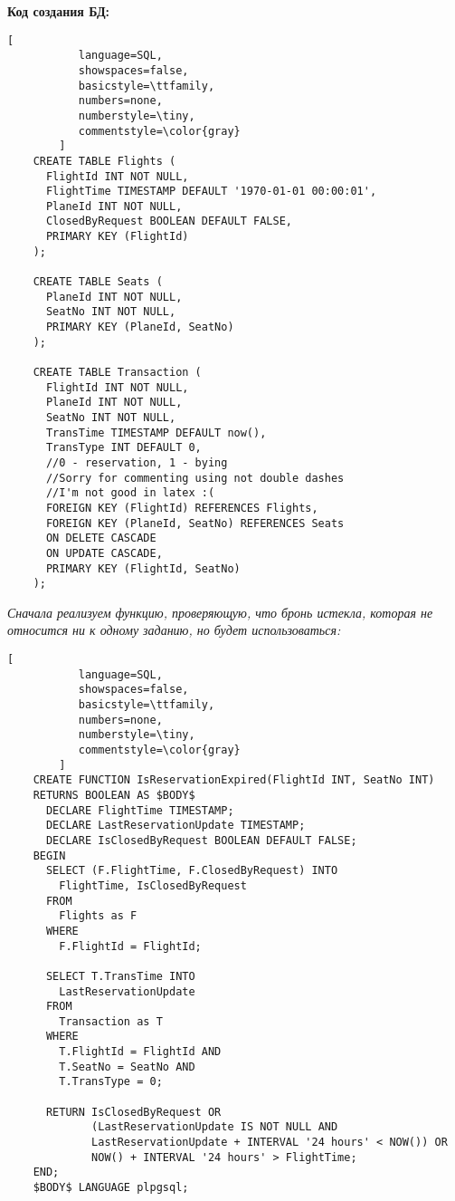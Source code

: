 \documentclass[11pt,a4paper,oneside]{article}
\begin{document}
\textbf{Код создания БД:}

\begin{lstlisting}[
           language=SQL,
           showspaces=false,
           basicstyle=\ttfamily,
           numbers=none,
           numberstyle=\tiny,
           commentstyle=\color{gray}
        ]
    CREATE TABLE Flights (
      FlightId INT NOT NULL,
      FlightTime TIMESTAMP DEFAULT '1970-01-01 00:00:01',
      PlaneId INT NOT NULL,
      ClosedByRequest BOOLEAN DEFAULT FALSE,
      PRIMARY KEY (FlightId)
    );

    CREATE TABLE Seats (
      PlaneId INT NOT NULL,
      SeatNo INT NOT NULL,
      PRIMARY KEY (PlaneId, SeatNo)
    );
    
    CREATE TABLE Transaction (
      FlightId INT NOT NULL,
      PlaneId INT NOT NULL,
      SeatNo INT NOT NULL,
      TransTime TIMESTAMP DEFAULT now(),
      TransType INT DEFAULT 0,
      //0 - reservation, 1 - bying
      //Sorry for commenting using not double dashes
      //I'm not good in latex :(
      FOREIGN KEY (FlightId) REFERENCES Flights,
      FOREIGN KEY (PlaneId, SeatNo) REFERENCES Seats
      ON DELETE CASCADE
      ON UPDATE CASCADE,
      PRIMARY KEY (FlightId, SeatNo)
    );
\end{lstlisting}

\textit{Сначала реализуем функцию, проверяющую, что бронь истекла, которая не относится ни к одному заданию, но будет использоваться:}

\begin{lstlisting}[
           language=SQL,
           showspaces=false,
           basicstyle=\ttfamily,
           numbers=none,
           numberstyle=\tiny,
           commentstyle=\color{gray}
        ]
    CREATE FUNCTION IsReservationExpired(FlightId INT, SeatNo INT)
    RETURNS BOOLEAN AS $BODY$
      DECLARE FlightTime TIMESTAMP;
      DECLARE LastReservationUpdate TIMESTAMP;
      DECLARE IsClosedByRequest BOOLEAN DEFAULT FALSE;
    BEGIN
      SELECT (F.FlightTime, F.ClosedByRequest) INTO
        FlightTime, IsClosedByRequest
      FROM
        Flights as F
      WHERE
        F.FlightId = FlightId;

      SELECT T.TransTime INTO
        LastReservationUpdate
      FROM
        Transaction as T
      WHERE
        T.FlightId = FlightId AND
        T.SeatNo = SeatNo AND
        T.TransType = 0;

      RETURN IsClosedByRequest OR
             (LastReservationUpdate IS NOT NULL AND
             LastReservationUpdate + INTERVAL '24 hours' < NOW()) OR
             NOW() + INTERVAL '24 hours' > FlightTime;
    END;
    $BODY$ LANGUAGE plpgsql;
\end{lstlisting}
\end{document}

